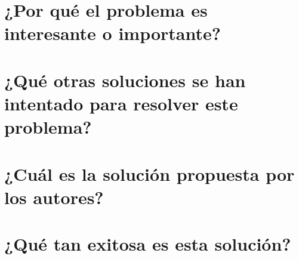 \section{¿Por qué el problema es interesante o importante?}

\section{¿Qué otras soluciones se han intentado para resolver este problema?}
     
\section{¿Cuál es la solución propuesta por los autores?}

\section{¿Qué tan exitosa es esta solución?} 